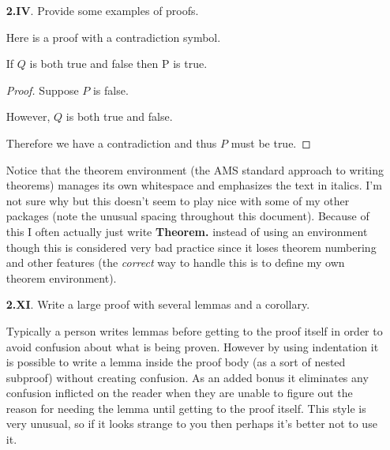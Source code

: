     \begin{enumerate}
      \item[\textbf{2.IV}.] %
        Provide some examples of proofs.

        \aspace

        Here is a proof with a contradiction symbol.
        \begin{thm}
          If $Q$ is both true and false then P is true.
        \end{thm}
        \renewcommand{\qedsymbol}{$\contradiction$}
        \begin{proof}
          Suppose $P$ is false.

          However, $Q$ is both true and false.

          Therefore we have a contradiction and thus $P$ must be true.
        \end{proof}
        \renewcommand{\qedsymbol}{$\square$}

        Notice that the theorem environment (the AMS standard approach to writing theorems) manages its own whitespace and emphasizes the text in italics. I'm not sure why but this doesn't seem to play nice with some of my other packages (note the unusual spacing throughout this document). Because of this I often actually just write \textbf{Theorem.} instead of using an environment though this is considered very bad practice since it loses theorem numbering and other features (the \emph{correct} way to handle this is to define my own theorem environment).

      \qspace

      \item[\textbf{2.XI}.]
        Write a large proof with several lemmas and a corollary.

        \aspace

        Typically a person writes lemmas before getting to the proof itself in order to avoid confusion about what is being proven. However by using indentation it is possible to write a lemma inside the proof body (as a sort of nested subproof) without creating confusion. As an added bonus it eliminates any confusion inflicted on the reader when they are unable to figure out the reason for needing the lemma until getting to the proof itself. This style is very unusual, so if it looks strange to you then perhaps it's better not to use it.


\end{enumerate}
